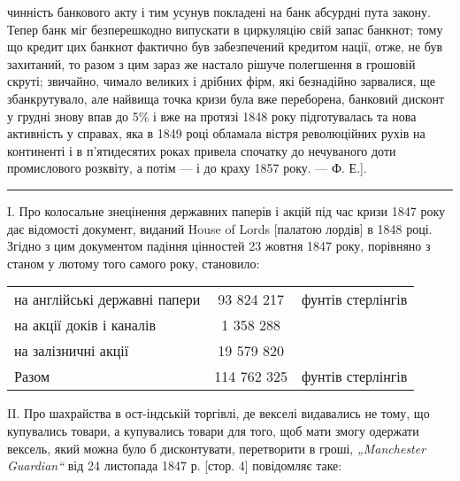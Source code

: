 \parcont{}  %
чинність банкового акту і тим усунув покладені на банк абсурдні пута закону. Тепер банк міг
безперешкодно випускати
в циркуляцію свій запас банкнот; тому що кредит цих банкнот
фактично був забезпечений кредитом нації, отже, не був захитаний, то разом з цим зараз же настало
рішуче полегшення
в грошовій скруті; звичайно, чимало великих і дрібних фірм,
які безнадійно зарвалися, ще збанкрутувало, але найвища точка
кризи була вже переборена, банковий дисконт у грудні знову
впав до 5\% і вже на протязі 1848 року підготувалась та нова
активність у справах, яка в 1849 році обламала вістря революційних рухів на континенті і в
п’ятидесятих роках привела спочатку до нечуваного доти промислового розквіту, а потім — і до
краху 1857 року. — Ф. Е.].

\pfbreak

I. Про колосальне знецінення державних паперів і акцій під час кризи
1847 року дає відомості документ, виданий House of Lords [палатою лордів]
в 1848 році. Згідно з цим документом падіння цінностей 23 жовтня 1847 року,
порівняно з станом у лютому того самого року, становило:
\begin{center}
\begin{tabular} {l c c}

на англійські державні папери & \phantom{0}93 824 217 & фунтів стерлінгів\\

на акції доків і каналів & \phantom{00}1 358 288 & \\

на залізничні акції & \phantom{0}19 579 820 & \\
\midrule
Разом & 114 762 325 & фунтів стерлінгів \\
\end{tabular}
\end{center}
II. Про шахрайства в ост-індській торгівлі, де векселі видавались не тому,
що купувались товари, а купувались товари для того, щоб мати змогу одержати вексель, який можна було
б дисконтувати, перетворити в гроші, \emph{„Manchester Guardian“} від 24 листопада 1847 р. [стор. 4]
повідомляє таке:

